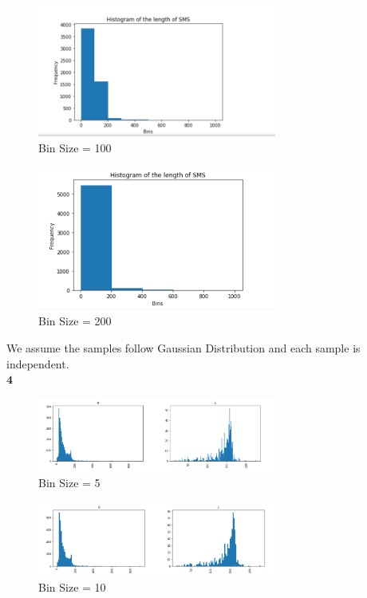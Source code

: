 \documentclass[12pt]{article}
\begin{document}
\begin{figure}[H] 
\centering 
\includegraphics[width=0.7\textwidth]{histogram7} 
\caption{Bin Size = 100}
\end{figure}

\begin{figure}[H] 
\centering 
\includegraphics[width=0.7\textwidth]{histogram8} 
\caption{Bin Size = 200}
\end{figure}


We assume the samples follow Gaussian Distribution and each sample is independent.\\

$\textbf{4}$\\

\begin{figure}[H] 
\centering 
\includegraphics[width=0.7\textwidth]{SMS1} 
\caption{Bin Size = 5}
\end{figure}

\begin{figure}[H] 
\centering 
\includegraphics[width=0.7\textwidth]{SMS2} 
\caption{Bin Size = 10}
\end{figure}
\end{document}
